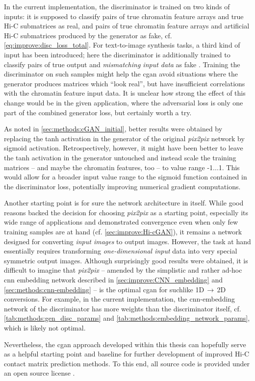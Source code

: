 In the current implementation, the discriminator is trained on two kinds of inputs:
it is supposed to classify pairs of true chromatin feature arrays and true Hi-C submatrices as real, 
and pairs of true chromatin feature arrays and artificial Hi-C submatrices produced by the generator as fake, cf. \cref{eq:improve:disc_loss_total}.
For text-to-image synthesis tasks, a third kind of input has been introduced; here the discriminator is additionally trained 
to classify pairs of true output and \emph{mismatching input data} as fake \cite{Reed2016}.
Training the discriminator on such samples might help the \acrshort{cgan} avoid situations 
where the generator produces matrices which ``look real'', 
but have insufficient correlations with the chromatin feature input data.
It is unclear how strong the effect of this change would be in the given application, 
where the adversarial loss is only one part of the combined generator loss, but certainly worth a try.

As noted in \cref{sec:methods:cGAN_initial}, better results were obtained by replacing the tanh activation in the generator 
of the original \emph{pix2pix} network by sigmoid activation.
Retrospectively, however, it might have been better to leave the tanh activation in the generator untouched
and instead scale the training matrices -- and maybe the chromatin features, too -- to value range -1...1.
This would allow for a broader input value range to the sigmoid function contained in the discriminator loss,
potentially improving numerical gradient computations.

Another starting point is for sure the network architecture in itself.
While good reasons backed the decision for choosing \emph{pix2pix} as a starting point,
especially its wide range of applications and demonstrated convergence even when only few training 
samples are at hand \cite{Isola2017} (cf. \cref{sec:improve:Hi-cGAN}),
it remains a network designed for converting \emph{input images} to output images.
However, the task at hand essentially requires transforming \emph{one-dimensional input} data into very special symmetric output images.
Although surprisingly good results were obtained, it is difficult to imagine that \emph{pix2pix} -- amended by the simplistic and rather ad-hoc \acrshort{cnn} embedding network 
described in \cref{sec:improve:CNN_embedding} and \ref{sec:methods:cnn-embedding} -- is the optimal \acrshort{cgan} for suchlike 1D\,$\rightarrow$\,2D conversions.
For example, in the current implementation, the \acrshort{cnn}-embedding network of the discriminator has more weights than the discriminator itself, 
cf. \cref{tab:methods:gen_disc_params} and \ref{tab:methods:embedding_network_params}, which is likely not optimal.

Nevertheless, the \acrshort{cgan} approach developed within this thesis can hopefully serve as a helpful starting point and baseline
for further development of improved Hi-C contact matrix prediction methods.
To this end, all source code is provided under an open source license \cite{Krauth2021a, Krauth2021b}.
\clearpage
